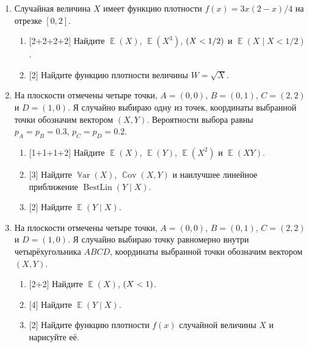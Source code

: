 \documentclass[12pt]{article}
\DeclareMathOperator{\Cov}{\mathbb{C}ov}
\DeclareMathOperator{\Var}{\mathbb{V}ar}
\DeclareMathOperator{\BestLin}{BestLin}
\let\P\relax
\DeclareMathOperator{\P}{\mathbb{P}}
\DeclareMathOperator{\E}{\mathbb{E}}
\begin{document}
{\begin{enumerate}
    \item %
    Случайная величина $X$ имеет функцию плотности $f(x) = 3x(2-x)/4$ на отрезке $[0, 2]$. 

    \begin{enumerate}
        \item {[2+2+2+2]} Найдите $\E(X)$, $\E(X^3)$, $\P(X < 1/2)$ и $\E(X \mid X < 1/2)$.
        \item {[2]} Найдите функцию плотности величины $W = \sqrt{X}$.
    \end{enumerate}

    \item %
    На плоскости отмечены четыре точки, $A = (0, 0)$, $B = (0, 1)$, $C = (2, 2)$ и $D = (1, 0)$.
Я случайно выбираю одну из точек, координаты выбранной точки обозначим вектором $(X, Y)$.
Вероятности выбора равны $p_A = p_B = 0.3$, $p_C = p_D = 0.2$.


\begin{enumerate}
    \item {[1+1+1+2]} Найдите $\E(X)$, $\E(Y)$, $\E(X^2)$ и $\E(XY)$.
    \item {[3]} Найдите $\Var(X)$, $\Cov(X, Y)$ и наилучшее линейное приближение $\BestLin(Y \mid X)$.
    \item {[2]} Найдите $\E(Y \mid X)$.
\end{enumerate}

\item     На плоскости отмечены четыре точки, $A = (0, 0)$, $B = (0, 1)$, $C = (2, 2)$ и $D = (1, 0)$.
Я случайно выбираю точку равномерно внутри четырёхугольника $ABCD$, координаты выбранной точки обозначим вектором $(X, Y)$.

\begin{enumerate}
    \item {[2+2]} Найдите $\E(X)$, $\P(X < 1)$.
    \item {[4]} Найдите $\E(Y \mid X)$.
    \item {[2]} Найдите функцию плотности $f(x)$ случайной величины $X$ и нарисуйте её. 
\end{enumerate}
\end{enumerate}
}

\thevariant

\newpage

\thevariant
\end{document}
